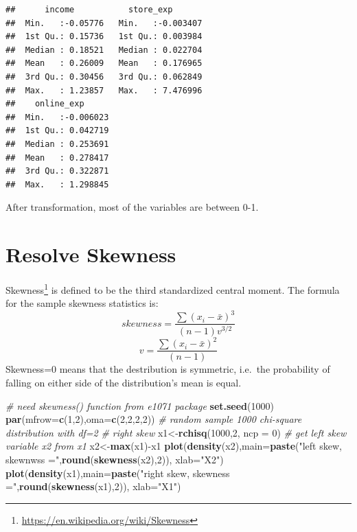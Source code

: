 \documentclass[12pt,]{krantz}
\newenvironment{Shaded}{\begin{snugshade}}{\end{snugshade}}
\newcommand{\KeywordTok}[1]{\textcolor[rgb]{0.13,0.29,0.53}{\textbf{{#1}}}}
\newcommand{\DataTypeTok}[1]{\textcolor[rgb]{0.13,0.29,0.53}{{#1}}}
\newcommand{\DecValTok}[1]{\textcolor[rgb]{0.00,0.00,0.81}{{#1}}}
\newcommand{\StringTok}[1]{\textcolor[rgb]{0.31,0.60,0.02}{{#1}}}
\newcommand{\CommentTok}[1]{\textcolor[rgb]{0.56,0.35,0.01}{\textit{{#1}}}}
\newcommand{\NormalTok}[1]{{#1}}
\renewcommand{\href}[2]{#2\footnote{\url{#1}}}
\theoremstyle{definition}
\theoremstyle{definition}
\theoremstyle{remark}
\begin{document}
\begin{verbatim}
##      income           store_exp        
##  Min.   :-0.05776   Min.   :-0.003407  
##  1st Qu.: 0.15736   1st Qu.: 0.003984  
##  Median : 0.18521   Median : 0.022704  
##  Mean   : 0.26009   Mean   : 0.176965  
##  3rd Qu.: 0.30456   3rd Qu.: 0.062849  
##  Max.   : 1.23857   Max.   : 7.476996  
##    online_exp       
##  Min.   :-0.006023  
##  1st Qu.: 0.042719  
##  Median : 0.253691  
##  Mean   : 0.278417  
##  3rd Qu.: 0.322871  
##  Max.   : 1.298845
\end{verbatim}

After transformation, most of the variables are between 0-1.

\section{Resolve Skewness}\label{resolve-skewness}

\href{https://en.wikipedia.org/wiki/Skewness}{Skewness} is defined to be
the third standardized central moment. The formula for the sample
skewness statistics is:
\[ skewness=\frac{\sum(x_{i}-\bar{x})^{3}}{(n-1)v^{3/2}}\]
\[v=\frac{\sum(x_{i}-\bar{x})^{2}}{(n-1)}\] Skewness=0 means that the
destribution is symmetric, i.e.~the probability of falling on either
side of the distribution's mean is equal.

\begin{Shaded}
\begin{Highlighting}[]
\CommentTok{# need skewness() function from e1071 package}
\KeywordTok{set.seed}\NormalTok{(}\DecValTok{1000}\NormalTok{)}
\KeywordTok{par}\NormalTok{(}\DataTypeTok{mfrow=}\KeywordTok{c}\NormalTok{(}\DecValTok{1}\NormalTok{,}\DecValTok{2}\NormalTok{),}\DataTypeTok{oma=}\KeywordTok{c}\NormalTok{(}\DecValTok{2}\NormalTok{,}\DecValTok{2}\NormalTok{,}\DecValTok{2}\NormalTok{,}\DecValTok{2}\NormalTok{))}
\CommentTok{# random sample 1000 chi-square distribution with df=2}
\CommentTok{# right skew}
\NormalTok{x1<-}\KeywordTok{rchisq}\NormalTok{(}\DecValTok{1000}\NormalTok{,}\DecValTok{2}\NormalTok{, }\DataTypeTok{ncp =} \DecValTok{0}\NormalTok{)}
\CommentTok{# get left skew variable x2 from x1}
\NormalTok{x2<-}\KeywordTok{max}\NormalTok{(x1)-x1}
\KeywordTok{plot}\NormalTok{(}\KeywordTok{density}\NormalTok{(x2),}\DataTypeTok{main=}\KeywordTok{paste}\NormalTok{(}\StringTok{"left skew, skewnwss ="}\NormalTok{,}\KeywordTok{round}\NormalTok{(}\KeywordTok{skewness}\NormalTok{(x2),}\DecValTok{2}\NormalTok{)), }\DataTypeTok{xlab=}\StringTok{"X2"}\NormalTok{)}
\KeywordTok{plot}\NormalTok{(}\KeywordTok{density}\NormalTok{(x1),}\DataTypeTok{main=}\KeywordTok{paste}\NormalTok{(}\StringTok{"right skew, skewness ="}\NormalTok{,}\KeywordTok{round}\NormalTok{(}\KeywordTok{skewness}\NormalTok{(x1),}\DecValTok{2}\NormalTok{)), }\DataTypeTok{xlab=}\StringTok{"X1"}\NormalTok{)}
\end{Highlighting}
\end{Shaded}
\end{document}

